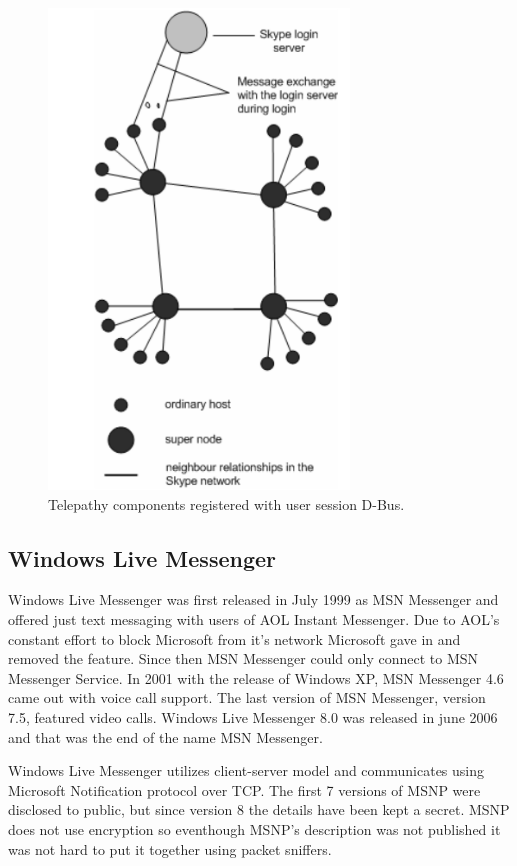 \begin{figure}[ht]
	\begin{center}
	\includegraphics[width=8cm]{fig/skype-architecture.png}
	\caption{Telepathy components registered with user session D-Bus.\cite{skypeProtocolAnalysis}}
	\label{fig:skypeArchitecture}
\end{center}
\end{figure}

\subsection*{Windows Live Messenger}
Windows Live Messenger was first released in July 1999 as MSN Messenger and offered just text messaging with users of AOL Instant Messenger\cite{AIM}. Due to AOL's constant effort to block Microsoft from it's network Microsoft gave in and removed the feature. Since then MSN Messenger could only connect to MSN Messenger Service. In 2001 with the release of Windows XP, MSN Messenger 4.6 came out with voice call support. The last version of MSN Messenger, version 7.5, featured video calls. Windows Live Messenger 8.0 was released in june 2006 and that was the end of the name MSN Messenger.   

Windows Live Messenger utilizes client-server model and communicates using Microsoft Notification protocol over TCP. The first 7 versions of MSNP were disclosed to public, but since version 8 the details have been kept a secret. MSNP does not use encryption so eventhough MSNP's description was not published it was not hard to put it together using packet sniffers.

